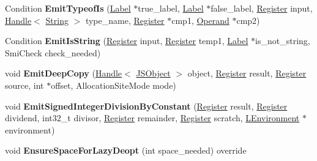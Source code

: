 \begin{DoxyCompactItemize}
\item 
Condition {\bfseries Emit\+Typeof\+Is} (\hyperlink{classv8_1_1internal_1_1_label}{Label} $\ast$true\+\_\+label, \hyperlink{classv8_1_1internal_1_1_label}{Label} $\ast$false\+\_\+label, \hyperlink{structv8_1_1internal_1_1_register}{Register} input, \hyperlink{classv8_1_1internal_1_1_handle}{Handle}$<$ \hyperlink{classv8_1_1internal_1_1_string}{String} $>$ type\+\_\+name, \hyperlink{structv8_1_1internal_1_1_register}{Register} $\ast$cmp1, \hyperlink{classv8_1_1internal_1_1_operand}{Operand} $\ast$cmp2)\hypertarget{classv8_1_1internal_1_1_l_code_gen_a2d315dd7193e45c742f3cb0d5d06e1bc}{}\label{classv8_1_1internal_1_1_l_code_gen_a2d315dd7193e45c742f3cb0d5d06e1bc}

\item 
Condition {\bfseries Emit\+Is\+String} (\hyperlink{structv8_1_1internal_1_1_register}{Register} input, \hyperlink{structv8_1_1internal_1_1_register}{Register} temp1, \hyperlink{classv8_1_1internal_1_1_label}{Label} $\ast$is\+\_\+not\+\_\+string, Smi\+Check check\+\_\+needed)\hypertarget{classv8_1_1internal_1_1_l_code_gen_a23c72e27a6bf50a391c940939754673d}{}\label{classv8_1_1internal_1_1_l_code_gen_a23c72e27a6bf50a391c940939754673d}

\item 
void {\bfseries Emit\+Deep\+Copy} (\hyperlink{classv8_1_1internal_1_1_handle}{Handle}$<$ \hyperlink{classv8_1_1internal_1_1_j_s_object}{J\+S\+Object} $>$ object, \hyperlink{structv8_1_1internal_1_1_register}{Register} result, \hyperlink{structv8_1_1internal_1_1_register}{Register} source, int $\ast$offset, Allocation\+Site\+Mode mode)\hypertarget{classv8_1_1internal_1_1_l_code_gen_a1a84a4d1ebc9ba8736407dd2a6d1214a}{}\label{classv8_1_1internal_1_1_l_code_gen_a1a84a4d1ebc9ba8736407dd2a6d1214a}

\item 
void {\bfseries Emit\+Signed\+Integer\+Division\+By\+Constant} (\hyperlink{structv8_1_1internal_1_1_register}{Register} result, \hyperlink{structv8_1_1internal_1_1_register}{Register} dividend, int32\+\_\+t divisor, \hyperlink{structv8_1_1internal_1_1_register}{Register} remainder, \hyperlink{structv8_1_1internal_1_1_register}{Register} scratch, \hyperlink{classv8_1_1internal_1_1_l_environment}{L\+Environment} $\ast$environment)\hypertarget{classv8_1_1internal_1_1_l_code_gen_a921bba648571479bdcadde646b58c9ba}{}\label{classv8_1_1internal_1_1_l_code_gen_a921bba648571479bdcadde646b58c9ba}

\item 
void {\bfseries Ensure\+Space\+For\+Lazy\+Deopt} (int space\+\_\+needed) override\hypertarget{classv8_1_1internal_1_1_l_code_gen_aef92ad7e2537ea5ecfdd73252a97eb48}{}\label{classv8_1_1internal_1_1_l_code_gen_aef92ad7e2537ea5ecfdd73252a97eb48}


\end{DoxyCompactItemize}

